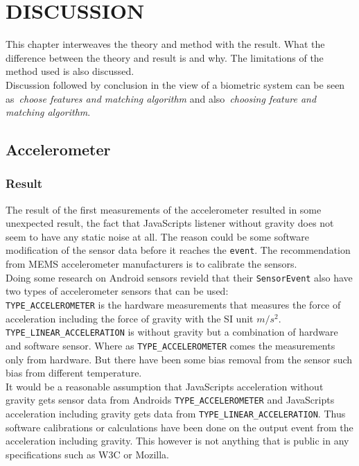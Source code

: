 \chapter{DISCUSSION}\label{cha:discussion}
This chapter interweaves the theory and method with the result. What the difference between the theory and result is and why. The limitations of the method used is also discussed. \\
Discussion followed by conclusion in the view of a biometric system can be seen as~\textit{choose features and matching algorithm} and also~\textit{choosing feature and matching algorithm}.

\section{Accelerometer}
\subsection{Result}
The result of the first measurements of the accelerometer resulted in some unexpected result, the fact that JavaScripts listener without gravity does not seem to have any static noise at all. The reason could be some software modification of the sensor data before it reaches the \texttt{event}. The recommendation from MEMS accelerometer manufacturers is to calibrate the sensors.~\cite[]{acc:kionixerr}\\ 
Doing some research on Android sensors revield that their \texttt{SensorEvent} also have two types of accelerometer sensors that can be used: \\
\texttt{TYPE\_ACCELEROMETER} is the hardware measurements that measures the force of acceleration including the force of gravity with the SI unit $m/s^2$. \\
\texttt{TYPE\_LINEAR\_ACCELERATION} is without gravity but a combination of hardware and software sensor. Where as \texttt{TYPE\_ACCELEROMETER} comes the measurements only from hardware. But there have been some bias removal from the sensor such bias from different temperature. \cite[]{android:sensorEvent}\\
It would be a reasonable assumption that JavaScripts acceleration without gravity gets sensor data from Androids \texttt{TYPE\_ACCELEROMETER} and JavaScripts acceleration including gravity gets data from \texttt{TYPE\_LINEAR\_ACCELERATION}. Thus software calibrations or calculations have been done on the output event from the acceleration including gravity. This however is not anything that is public in any specifications such as W3C or Mozilla.~\cite[]{sensor:W3Cspec}~\cite[]{sensor:accIncludingGravity}\\ 
